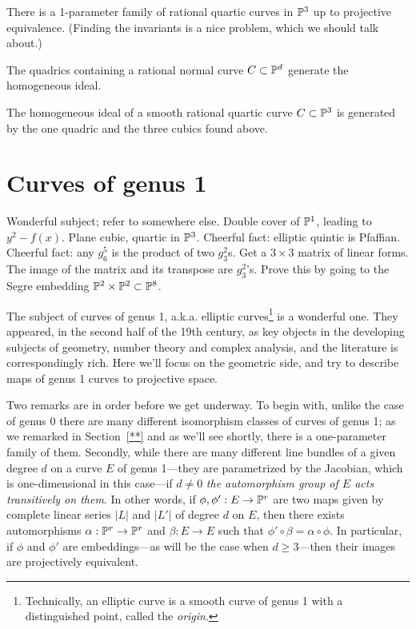 There is a 1-parameter family of rational quartic curves in $\PP^3$ up to projective equivalence. (Finding the invariants is a nice problem, which we should talk about.)

The quadrics containing a rational normal curve $C \subset \PP^d$ generate the homogeneous ideal.

The homogeneous ideal of a smooth rational quartic curve $C \subset \PP^3$ is generated by the one quadric and the three cubics found above.


\section{Curves of genus 1}

Wonderful subject; refer to somewhere else. Double cover of $\PP^1$, leading to $y^2 - f(x)$. Plane cubic, quartic in $\PP^3$. Cheerful fact:  elliptic quintic is Pfaffian. Cheerful fact: any $g^5_6$ is the product of two $g^2_3$s. Get a $3\times 3$ matrix of linear forms. The image of the matrix and its transpose are $g^2_3$'s. Prove this by going to the Segre embedding $\PP^2\times \PP^2 \subset\PP^8$.

The subject of curves of genus 1, a.k.a. elliptic curves\footnote{Technically, an elliptic curve is a smooth curve of genus 1 with a distinguished point, called the \emph{origin}.} is a wonderful one. They appeared, in the second half of the 19th century, as key objects in the developing subjects of geometry, number theory and complex analysis, and the literature is correspondingly rich. Here we'll focus on the geometric side, and try to describe maps of genus 1 curves to projective space.

Two remarks are in order before we get underway. To begin with, unlike the case of genus 0 there are many different isomorphism classes of curves of genus 1; as we remarked in Section~\ref{**} and as we'll see shortly, there is a one-parameter family of them. Secondly, while there are many different line bundles of a given degree $d$ on a curve $E$ of genus 1---they are parametrized by the Jacobian, which is one-dimensional in this case---if $d \neq 0$ \emph{the automorphism group of $E$ acts transitively on them}. In other words, if $\phi, \phi' : E \to \PP^r$ are two maps given by complete linear series $|L|$ and $|L'|$ of degree $d$ on $E$, then there exists  automorphisms $\alpha : \PP^r \to \PP^r$ and $\beta : E \to E$ such that $\phi' \circ \beta= \alpha \circ \phi$. In particular, if $\phi$ and $\phi'$ are embeddings---as will be the case when $d \geq 3$---then their images are projectively equivalent.

